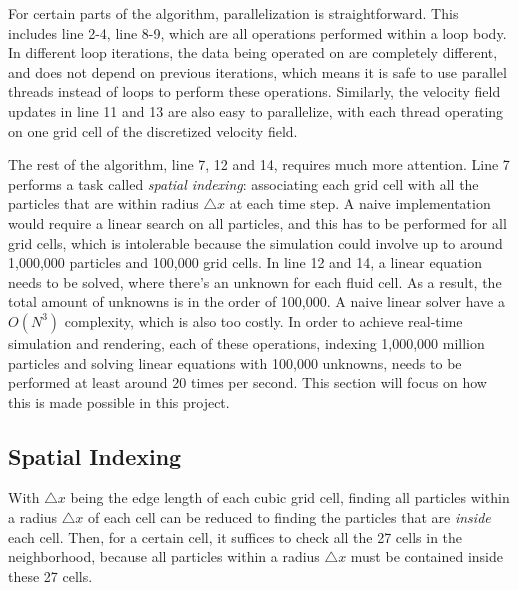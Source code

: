 For certain parts of the algorithm, parallelization is straightforward. This includes line 2-4, line 8-9, which are all operations performed within a loop body. In different loop iterations, the data being operated on are completely different, and does not depend on previous iterations, which means it is safe to use parallel threads instead of loops to perform these operations. Similarly, the velocity field updates in line 11 and 13 are also easy to parallelize, with each thread operating on one grid cell of the discretized velocity field. 

The rest of the algorithm, line 7, 12 and 14, requires much more attention. Line 7 performs a task called \textit{spatial indexing}: associating each grid cell with all the particles that are within radius $\triangle x$ at each time step. A naive implementation would require a linear search on all particles, and this has to be performed for all grid cells, which is intolerable because the simulation could involve up to around 1,000,000 particles and 100,000 grid cells. In line 12 and 14, a linear equation needs to be solved, where there's an unknown for each fluid cell. As a result, the total amount of unknowns is in the order of 100,000. A naive linear solver have a $O(N^3)$ complexity, which is also too costly. In order to achieve real-time simulation and rendering, each of these operations, indexing 1,000,000 million particles and solving linear equations with 100,000 unknowns, needs to be performed at least around 20 times per second. This section will focus on how this is made possible in this project.

\subsection{Spatial Indexing}

With $\triangle x$ being the edge length of each cubic grid cell, finding all particles within a radius $\triangle x$ of each cell can be reduced to finding the particles that are \textit{inside} each cell. Then, for a certain cell, it suffices to check all the 27 cells in the neighborhood, because all particles within a radius $\triangle x$ must be contained inside these 27 cells. 

